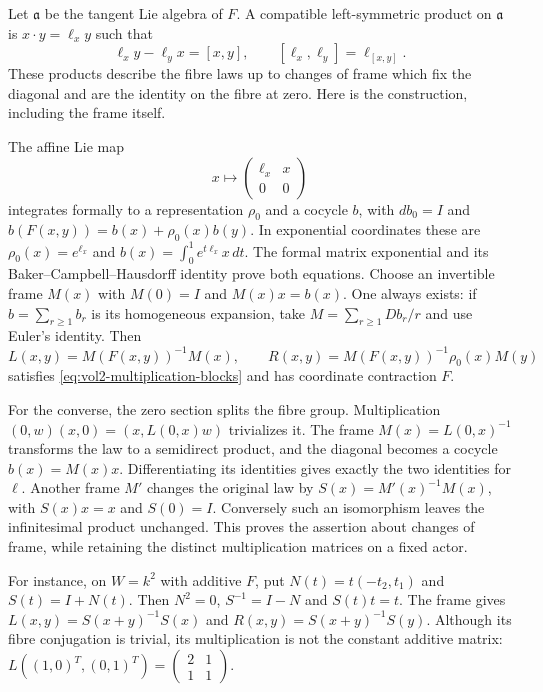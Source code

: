 Let $\mathfrak a$ be the tangent Lie algebra of $F$.
A compatible left-symmetric product on $\mathfrak a$ is
$x\cdot y=\ell_xy$ such that
\[
 \ell_xy-\ell_yx=[x,y],\qquad
 [\ell_x,\ell_y]=\ell_{[x,y]}.
\]
These products describe the fibre laws up to changes of frame
which fix the diagonal and are the identity on the fibre at zero.
Here is the construction, including the frame itself.

The affine Lie map
\[
 x\longmapsto\begin{pmatrix}\ell_x&x\\0&0\end{pmatrix}
\]
integrates formally to a representation $\rho_0$ and a cocycle
$b$, with $db_0=I$ and
$b(F(x,y))=b(x)+\rho_0(x)b(y)$.
In exponential coordinates these are
$\rho_0(x)=e^{\ell_x}$ and
$b(x)=\int_0^1e^{t\ell_x}x\,dt$. The formal matrix
exponential and its Baker--Campbell--Hausdorff identity prove
both equations. Choose an invertible frame $M(x)$ with
$M(0)=I$ and $M(x)x=b(x)$. One always exists: if
$b=\sum_{r\geq1}b_r$ is its homogeneous expansion, take
$M=\sum_{r\geq1}Db_r/r$ and use Euler's identity.
Then
\begin{equation}\label{eq:vol2-graded-frame}
 L(x,y)=M(F(x,y))^{-1}M(x),\qquad
 R(x,y)=M(F(x,y))^{-1}\rho_0(x)M(y)
\end{equation}
satisfies \eqref{eq:vol2-multiplication-blocks} and has
coordinate contraction $F$.

For the converse, the zero section splits the fibre group.
Multiplication $(0,w)(x,0)=(x,L(0,x)w)$ trivializes it.
The frame $M(x)=L(0,x)^{-1}$ transforms the law to a
semidirect product, and the diagonal becomes a cocycle
$b(x)=M(x)x$. Differentiating its identities gives exactly
the two identities for $\ell$. Another frame $M'$ changes
the original law by $S(x)=M'(x)^{-1}M(x)$, with $S(x)x=x$
and $S(0)=I$. Conversely such an isomorphism leaves the
infinitesimal product unchanged. This proves the assertion
about changes of frame, while retaining the distinct
multiplication matrices on a fixed actor.

For instance, on $W=k^2$ with additive $F$, put
$N(t)=t(-t_2,t_1)$ and $S(t)=I+N(t)$. Then $N^2=0$,
$S^{-1}=I-N$ and $S(t)t=t$. The frame gives
$L(x,y)=S(x+y)^{-1}S(x)$ and
$R(x,y)=S(x+y)^{-1}S(y)$. Although its fibre conjugation
is trivial, its multiplication is not the constant additive
matrix: $L((1,0)^T,(0,1)^T)=
\left(\begin{smallmatrix}2&1\\1&1\end{smallmatrix}\right)$.

